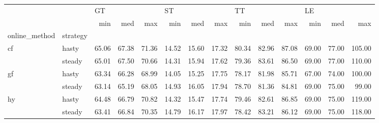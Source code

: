 \begin{tabular}{llrrrrrrrrrrrr}
\toprule
   &        & \multicolumn{3}{l}{GT} & \multicolumn{3}{l}{ST} & \multicolumn{3}{l}{TT} & \multicolumn{3}{l}{LE} \\
   &        &   min &   med &   max &   min &   med &   max &   min &   med &   max &   min &   med &    max \\
online\_method & strategy &       &       &       &       &       &       &       &       &       &       &       &        \\
\midrule
cf & hasty & 65.06 & 67.38 & 71.36 & 14.52 & 15.60 & 17.32 & 80.34 & 82.96 & 87.08 & 69.00 & 77.00 & 105.00 \\
   & steady & 65.01 & 67.50 & 70.66 & 14.31 & 15.94 & 17.62 & 79.36 & 83.61 & 86.50 & 69.00 & 77.00 & 110.00 \\
gf & hasty & 63.34 & 66.28 & 68.99 & 14.05 & 15.25 & 17.75 & 78.17 & 81.98 & 85.71 & 67.00 & 74.00 & 100.00 \\
   & steady & 63.14 & 65.19 & 68.05 & 14.93 & 16.05 & 17.94 & 78.70 & 81.36 & 84.81 & 69.00 & 75.00 &  99.00 \\
hy & hasty & 64.48 & 66.79 & 70.82 & 14.32 & 15.47 & 17.74 & 79.46 & 82.61 & 86.85 & 69.00 & 75.00 & 119.00 \\
   & steady & 63.41 & 66.84 & 70.35 & 14.79 & 16.17 & 17.97 & 78.42 & 83.21 & 86.12 & 69.00 & 75.00 & 118.00 \\
\bottomrule
\end{tabular}
